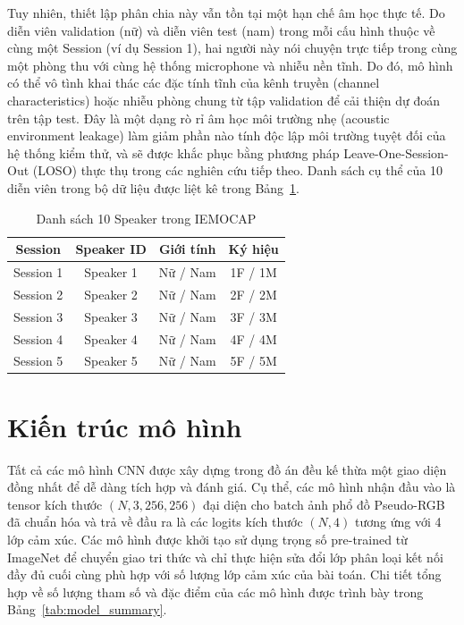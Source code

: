 Tuy nhiên, thiết lập phân chia này vẫn tồn tại một hạn chế âm học thực tế. Do diễn viên validation (nữ) và diễn viên test (nam) trong mỗi cấu hình thuộc về cùng một Session (ví dụ Session 1), hai người này nói chuyện trực tiếp trong cùng một phòng thu với cùng hệ thống microphone và nhiễu nền tĩnh. Do đó, mô hình có thể vô tình khai thác các đặc tính tĩnh của kênh truyền (channel characteristics) hoặc nhiễu phòng chung từ tập validation để cải thiện dự đoán trên tập test. Đây là một dạng rò rỉ âm học môi trường nhẹ (acoustic environment leakage) làm giảm phần nào tính độc lập môi trường tuyệt đối của hệ thống kiểm thử, và sẽ được khắc phục bằng phương pháp Leave-One-Session-Out (LOSO) thực thụ trong các nghiên cứu tiếp theo. Danh sách cụ thể của 10 diễn viên trong bộ dữ liệu được liệt kê trong Bảng~\ref{tab:speakers}.

\begin{table}[H]
\centering
\caption{Danh sách 10 Speaker trong IEMOCAP}
\label{tab:speakers}
\begin{tabular}{cccc}
\toprule
\textbf{Session} & \textbf{Speaker ID} & \textbf{Giới tính} & \textbf{Ký hiệu} \\
\midrule
Session 1 & Speaker 1 & Nữ / Nam & 1F / 1M \\
Session 2 & Speaker 2 & Nữ / Nam & 2F / 2M \\
Session 3 & Speaker 3 & Nữ / Nam & 3F / 3M \\
Session 4 & Speaker 4 & Nữ / Nam & 4F / 4M \\
Session 5 & Speaker 5 & Nữ / Nam & 5F / 5M \\
\bottomrule
\end{tabular}
\end{table}


\section{Kiến trúc mô hình}
\label{sec:model_architecture}

Tất cả các mô hình CNN được xây dựng trong đồ án đều kế thừa một giao diện đồng nhất để dễ dàng tích hợp và đánh giá. Cụ thể, các mô hình nhận đầu vào là tensor kích thước $(N, 3, 256, 256)$ đại diện cho batch ảnh phổ đồ Pseudo-RGB đã chuẩn hóa và trả về đầu ra là các logits kích thước $(N, 4)$ tương ứng với 4 lớp cảm xúc. Các mô hình được khởi tạo sử dụng trọng số pre-trained từ ImageNet để chuyển giao tri thức và chỉ thực hiện sửa đổi lớp phân loại kết nối đầy đủ cuối cùng phù hợp với số lượng lớp cảm xúc của bài toán. Chi tiết tổng hợp về số lượng tham số và đặc điểm của các mô hình được trình bày trong Bảng~\ref{tab:model_summary}.

